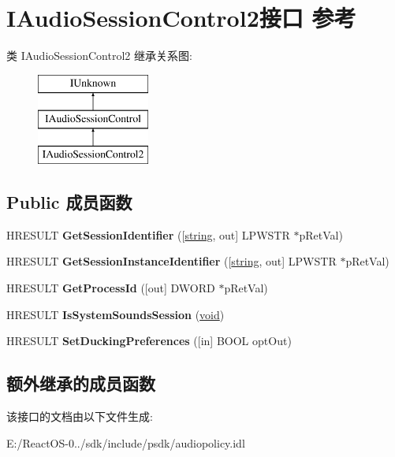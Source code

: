 \hypertarget{interface_i_audio_session_control2}{}\section{I\+Audio\+Session\+Control2接口 参考}
\label{interface_i_audio_session_control2}
类 I\+Audio\+Session\+Control2 继承关系图\+:\begin{figure}[H]
\begin{center}
\leavevmode
\includegraphics[height=3.000000cm]{interface_i_audio_session_control2}
\end{center}
\end{figure}
\subsection*{Public 成员函数}
\begin{DoxyCompactItemize}
\item 
\mbox{\label{interface_i_audio_session_control2_af35edde77e968772f4421c6e8cc7e231}} 
H\+R\+E\+S\+U\+LT {\bfseries Get\+Session\+Identifier} (\mbox{[}\hyperlink{structstring}{string}, out\mbox{]} L\+P\+W\+S\+TR $\ast$p\+Ret\+Val)
\item 
\mbox{\label{interface_i_audio_session_control2_ab2a4b1295920167db67899e5e058142f}} 
H\+R\+E\+S\+U\+LT {\bfseries Get\+Session\+Instance\+Identifier} (\mbox{[}\hyperlink{structstring}{string}, out\mbox{]} L\+P\+W\+S\+TR $\ast$p\+Ret\+Val)
\item 
\mbox{\label{interface_i_audio_session_control2_ae1e178df698f0335061e19af5bab5b24}} 
H\+R\+E\+S\+U\+LT {\bfseries Get\+Process\+Id} (\mbox{[}out\mbox{]} D\+W\+O\+RD $\ast$p\+Ret\+Val)
\item 
\mbox{\label{interface_i_audio_session_control2_a4da76451fbe3f902ff062f746ee1507d}} 
H\+R\+E\+S\+U\+LT {\bfseries Is\+System\+Sounds\+Session} (\hyperlink{interfacevoid}{void})
\item 
\mbox{\label{interface_i_audio_session_control2_a0d82a79599d9a4f10160d003fa075c35}} 
H\+R\+E\+S\+U\+LT {\bfseries Set\+Ducking\+Preferences} (\mbox{[}in\mbox{]} B\+O\+OL opt\+Out)
\end{DoxyCompactItemize}
\subsection*{额外继承的成员函数}


该接口的文档由以下文件生成\+:\begin{DoxyCompactItemize}
\item 
E\+:/\+React\+O\+S-\/0../sdk/include/psdk/audiopolicy.\+idl\end{DoxyCompactItemize}
